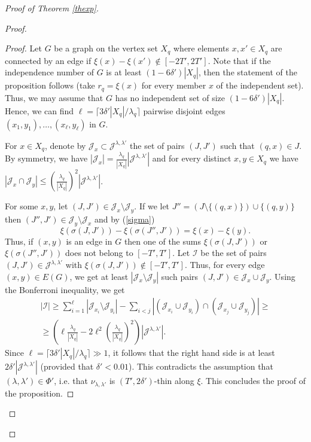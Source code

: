 \documentclass{daj}
\renewcommand{\le}{\leqslant}
\renewcommand{\ge}{\geqslant}
\newcommand{\J}{\mathcal J}
\theoremstyle{definition}
\theoremstyle{remark}
\theoremstyle{definition}
\theoremstyle{definition}
\begin{document}
\begin{proof}[Proof of Theorem \ref{thexp}]
\begin{proof}
\begin{proof}
Let $G$ be a graph on the vertex set $X_q$ where elements $x, x' \in X_q$ are connected by an edge if $\xi(x) - \xi(x') \not \in [-2T', 2T']$. Note that if the independence number of $G$ is at least $(1-6\delta') |X_q|$, then the statement of the proposition follows (take $r_q = \xi(x)$ for every member $x$ of the independent set). Thus, we may assume that $G$ has no independent set of size $(1-6\delta') |X_q|$. Hence, we can find $\ell = \lceil 3\delta'|X_q| / \lambda_q \rceil$ pairwise disjoint edges $(x_1, y_1), \ldots, (x_\ell, y_\ell)$ in $G$.

For $x \in X_q$, denote by $\J_x \subset \J^{\lambda, \lambda'}$ the set of pairs $(J, J')$ such that $(q,x) \in J$. By symmetry, we have $|\J_x| = \frac{\lambda_q}{|X_q|} |\J^{\lambda, \lambda'}|$ and for every distinct $x, y \in X_q$ we have $|\J_x \cap \J_y| \le  \left( \frac{\lambda_q}{|X_q|} \right)^2|\J^{\lambda, \lambda'}|$. 

For some $x, y$, let $(J, J') \in \J_x \setminus \J_y$. If we let $J'' = (J \setminus \{(q,x)\}) \cup \{(q,y)\}$ then $(J'', J') \in \J_y \setminus \J_x$ and by (\ref{sigma})
$$
\xi(\sigma(J, J')) - \xi(\sigma(J'', J')) = \xi(x) - \xi(y).
$$
Thus, if $(x, y)$ is an edge in $G$ then one of the sums $\xi(\sigma(J, J'))$ or $\xi(\sigma(J'', J'))$ does not belong to $[-T', T']$. Let $\mathcal I$ be the set of pairs $(J, J') \in \J^{\lambda, \lambda'}$ with $\xi(\sigma(J, J')) \not \in [-T', T']$. 
Thus, for every edge $(x, y) \in E(G)$, we get at least $|\J_x \setminus \J_y|$ such pairs $(J, J') \in \J_x \cup \J_y$. Using the Bonferroni inequality, we get
\begin{align*}
|\mathcal I| \ge \sum_{i=1}^\ell |\J_{x_i} \setminus \J_{y_i}| - \sum_{i < j} |(\J_{x_i} \cup \J_{y_i}) \cap (\J_{x_j} \cup \J_{y_j})| \ge\\
\ge \left(\ell \frac{\lambda_q}{|X_q|} - 2 \ell^2 \left (\frac{\lambda_q}{|X_q|}\right)^2\right) |\J^{\lambda, \lambda'}|.
\end{align*}
Since $\ell = \lceil 3\delta' |X_q|/\lambda_q \rceil \gg 1$, it follows that the right hand side is at least $2\delta' |\J^{\lambda, \lambda'}|$ (provided that $\delta' < 0.01$). This contradicts the assumption that $(\lambda, \lambda') \in \Phi'$, i.e. that $\nu_{\lambda, \lambda'}$ is $(T', 2\delta')$-thin along $\xi$. This concludes the proof of the proposition.
\end{proof}


\end{proof}
\end{proof}
\end{document}

